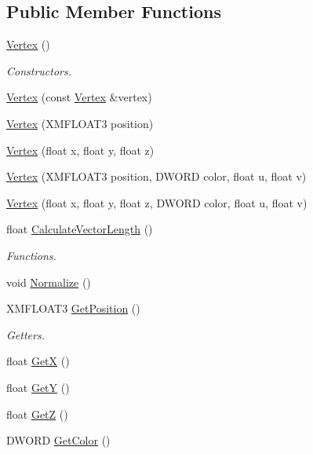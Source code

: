 \subsection*{Public Member Functions}
\begin{DoxyCompactItemize}
\item 
\hyperlink{class_vertex_a97488994a2482d70da74e1b91d40e169}{Vertex} ()
\begin{DoxyCompactList}\small\item\em Constructors. \end{DoxyCompactList}\item 
\hyperlink{class_vertex_a86a01a9679eed567448b8165ba335ddf}{Vertex} (const \hyperlink{class_vertex}{Vertex} \&vertex)
\item 
\hyperlink{class_vertex_ab3aaaa3fea9602eaf3d80c42702a6d5f}{Vertex} (X\+M\+F\+L\+O\+A\+T3 position)
\item 
\hyperlink{class_vertex_a2c558c054a0a2c970588c063073803a0}{Vertex} (float x, float y, float z)
\item 
\hyperlink{class_vertex_a9be3dce54b0ff2b0338ba00ba4307cab}{Vertex} (X\+M\+F\+L\+O\+A\+T3 position, D\+W\+O\+RD color, float u, float v)
\item 
\hyperlink{class_vertex_a00ab3eccce14fd1aa56662437977f40a}{Vertex} (float x, float y, float z, D\+W\+O\+RD color, float u, float v)
\item 
float \hyperlink{class_vertex_a8c00f077ae72434ebba3687b03135105}{Calculate\+Vector\+Length} ()
\begin{DoxyCompactList}\small\item\em Functions. \end{DoxyCompactList}\item 
void \hyperlink{class_vertex_a8094b5faac3ce2dd40a4d112133ffc73}{Normalize} ()
\item 
X\+M\+F\+L\+O\+A\+T3 \hyperlink{class_vertex_a96920908f0adadf6d6fef447013a32fc}{Get\+Position} ()
\begin{DoxyCompactList}\small\item\em Getters. \end{DoxyCompactList}\item 
float \hyperlink{class_vertex_a92792a1608974b53e87f7cba979cf97c}{GetX} ()
\item 
float \hyperlink{class_vertex_a89139909c6a69257d7d3b2234a01c304}{GetY} ()
\item 
float \hyperlink{class_vertex_afea768f12fdbb44ee051414fea2d44d0}{GetZ} ()
\item 
D\+W\+O\+RD \hyperlink{class_vertex_a636bda7b90b61dd6e23cc84c3781e5a5}{Get\+Color} ()

\end{DoxyCompactItemize}
